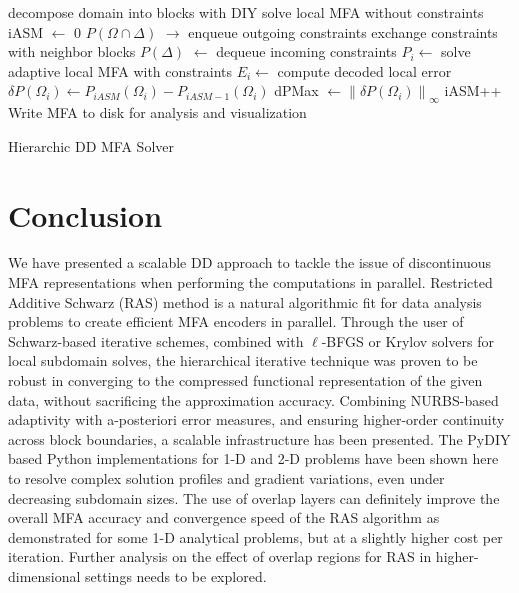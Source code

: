 \documentclass[conference]{IEEEtran}
\begin{document}
\begin{algorithm}
	\DontPrintSemicolon
	decompose domain into blocks with DIY\;
	solve local MFA without constraints\;
	\;
	iASM $\leftarrow$ 0 
	{
		$P(\Omega \cap \Delta)$ $\rightarrow$ enqueue outgoing constraints\;
		exchange constraints with neighbor blocks\;
		$P(\Delta)$ $\leftarrow$ dequeue incoming constraints\;
		\;
		{
			$P_i \leftarrow$ solve adaptive local MFA with constraints\;
			$E_i \leftarrow$ compute decoded local error\;
			$\delta P (\Omega_i) \leftarrow P_{iASM} (\Omega_i) - P_{iASM-1} (\Omega_i)$\;
		}
		dPMax $\leftarrow \left\lVert \delta P (\Omega_i) \right\rVert_{\infty}$\;
		iASM++\;
	}
	\;
    Write MFA to disk for analysis and visualization
	\caption{Hierarchic DD MFA Solver}
	\label{alg:pseudocode}
\end{algorithm}



\section{Conclusion}

We have presented a scalable DD approach to tackle the issue of discontinuous MFA representations when performing the computations in parallel. Restricted Additive Schwarz (RAS) method is a natural algorithmic fit for data analysis problems to create efficient MFA encoders in parallel. Through the user of Schwarz-based iterative schemes, combined with $\ell$-BFGS or Krylov solvers for local subdomain solves, the hierarchical iterative technique was proven to be robust in converging to the compressed functional representation of the given data, without sacrificing the approximation accuracy. Combining NURBS-based adaptivity with a-posteriori error measures, and ensuring higher-order continuity across block boundaries, a scalable infrastructure has been presented. The PyDIY based Python implementations for 1-D and 2-D problems have been shown here to resolve complex solution profiles and gradient variations, even under decreasing subdomain sizes. The use of overlap layers can definitely improve the overall MFA accuracy and convergence speed of the RAS algorithm as demonstrated for some 1-D analytical problems, but at a slightly higher cost per iteration. Further analysis on the effect of overlap regions for RAS in higher-dimensional settings needs to be explored. 
\end{document}
